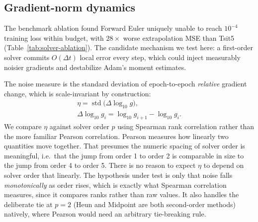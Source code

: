 \subsection{Gradient-norm dynamics}
\label{sec:track-b}

The benchmark ablation found Forward Euler uniquely unable to reach $10^{-4}$
training loss within budget, with $28\times$ worse extrapolation MSE than
Tsit5 (Table~\ref{tab:solver-ablation}). The candidate mechanism we test
here: a first-order solver commits $O(\Delta t)$ local error every step,
which could inject measurably noisier gradients and destabilize Adam's
moment estimates.

\begin{expectbox}
\end{expectbox}

The noise measure is the standard deviation of epoch-to-epoch \emph{relative}
gradient change, which is scale-invariant by construction:
\begin{equation}
\begin{gathered}
\eta = \operatorname{std}\big(\Delta\log_{10} g\big), \\
\Delta\log_{10} g_i = \log_{10} g_{i+1} - \log_{10} g_i.
\end{gathered}
\label{eq:noise-measure}
\end{equation}
We compare $\eta$ against solver order $p$ using Spearman rank correlation
rather than the more familiar Pearson correlation. Pearson measures how
linearly two quantities move together. That presumes the numeric spacing of
solver order is meaningful, i.e.\ that the jump from order 1 to order 2 is
comparable in size to the jump from order 4 to order 5. There is no reason
to expect $\eta$ to depend on solver order that linearly. The hypothesis
under test is only that noise falls \emph{monotonically} as order rises,
which is exactly what Spearman correlation measures, since it compares ranks
rather than raw values. It also handles the deliberate tie at $p=2$ (Heun and
Midpoint are both second-order methods) natively, where Pearson would need
an arbitrary tie-breaking rule.

